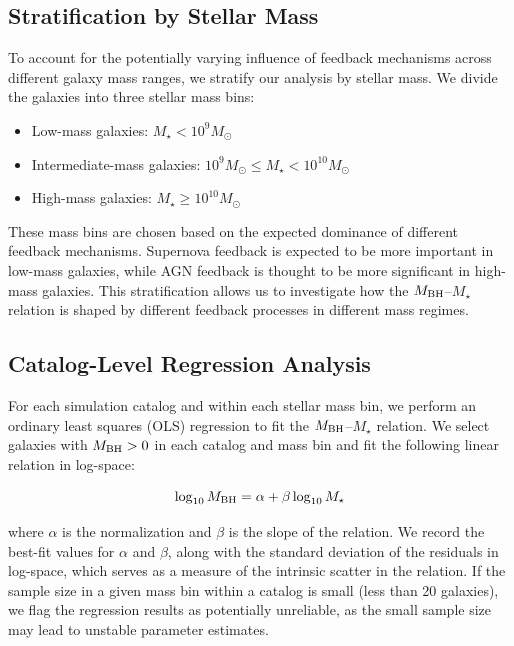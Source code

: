 \documentclass[twocolumn]{aastex631}
\begin{document}
\subsection{Stratification by Stellar Mass}

To account for the potentially varying influence of feedback mechanisms across different galaxy mass ranges, we stratify our analysis by stellar mass. We divide the galaxies into three stellar mass bins:

\begin{itemize}
    \item Low-mass galaxies: $M_{\star} < 10^9 M_{\odot}$
    \item Intermediate-mass galaxies: $10^9 M_{\odot} \leq M_{\star} < 10^{10} M_{\odot}$
    \item High-mass galaxies: $M_{\star} \geq 10^{10} M_{\odot}$
\end{itemize}

These mass bins are chosen based on the expected dominance of different feedback mechanisms. Supernova feedback is expected to be more important in low-mass galaxies, while AGN feedback is thought to be more significant in high-mass galaxies. This stratification allows us to investigate how the $M_{\rm BH}$--$M_{\star}$ relation is shaped by different feedback processes in different mass regimes.

\subsection{Catalog-Level Regression Analysis}

For each simulation catalog and within each stellar mass bin, we perform an ordinary least squares (OLS) regression to fit the $M_{\rm BH}$--$M_{\star}$ relation. We select galaxies with $M_{\rm BH} > 0$ in each catalog and mass bin and fit the following linear relation in log-space:

$$ \log_{10} M_{\rm BH} = \alpha + \beta \log_{10} M_{\star} $$

where $\alpha$ is the normalization and $\beta$ is the slope of the relation. We record the best-fit values for $\alpha$ and $\beta$, along with the standard deviation of the residuals in log-space, which serves as a measure of the intrinsic scatter in the relation. If the sample size in a given mass bin within a catalog is small (less than 20 galaxies), we flag the regression results as potentially unreliable, as the small sample size may lead to unstable parameter estimates.
\end{document}
